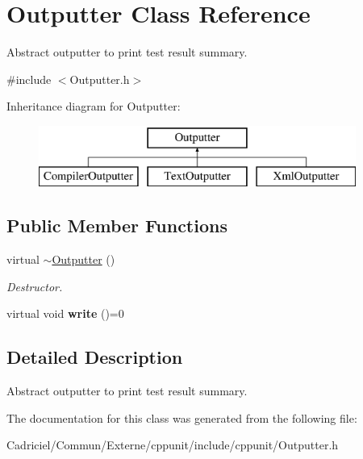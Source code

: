 \hypertarget{class_outputter}{}\section{Outputter Class Reference}
\label{class_outputter}


Abstract outputter to print test result summary.  




{\ttfamily \#include $<$Outputter.\+h$>$}

Inheritance diagram for Outputter\+:\begin{figure}[H]
\begin{center}
\leavevmode
\includegraphics[height=2.000000cm]{class_outputter}
\end{center}
\end{figure}
\subsection*{Public Member Functions}
\begin{DoxyCompactItemize}
\item 
virtual \hyperlink{class_outputter_a0af584ecb81380ff38e3875b65ad4dd5}{$\sim$\+Outputter} ()\hypertarget{class_outputter_a0af584ecb81380ff38e3875b65ad4dd5}{}\label{class_outputter_a0af584ecb81380ff38e3875b65ad4dd5}

\begin{DoxyCompactList}\small\item\em Destructor. \end{DoxyCompactList}\item 
virtual void {\bfseries write} ()=0\hypertarget{class_outputter_a0a5f32693d53ed33ceb8385041cb4b68}{}\label{class_outputter_a0a5f32693d53ed33ceb8385041cb4b68}

\end{DoxyCompactItemize}


\subsection{Detailed Description}
Abstract outputter to print test result summary. 

The documentation for this class was generated from the following file\+:\begin{DoxyCompactItemize}
\item 
Cadriciel/\+Commun/\+Externe/cppunit/include/cppunit/Outputter.\+h\end{DoxyCompactItemize}
